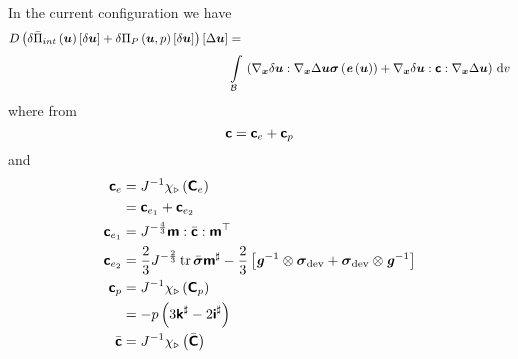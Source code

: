 In the current configuration we have
\begin{equation}
  \begin{split}
    \directionalderiv{}{\variation{\fnof{\bar{\Pi}_{int}}{\vectr{u}}}{\vectr{u}}+\variation{\fnof{\Pi_{P}}{\vectr{u},p}}{\vectr{u}}}{\linearisationdir{\vectr{u}}}&= \\
  &\gint{\embedmanifold{B}}{}{\pbrac{\doubledotprod{\gradient{\vectr{x}}{\variationdir{\vectr{u}}}}{\gradient{\vectr{x}}{\linearisationdir{\vectr{u}}}\fnof{\tensor{\sigma}}{\fnof{\tensor{e}}{\vectr{u}}}}+
            \doubledotprod{\gradient{\vectr{x}}{\variationdir{\vectr{u}}}}{\doubledotprod{\tensorfour{c}}{\gradient{\vectr{x}}{\linearisationdir{\vectr{u}}}}}}}{v}
  \end{split}
\end{equation}
where from 
\begin{equation}
  \boldsymbol{\mathsf{c}}=\boldsymbol{\mathsf{c}}_{e}+\boldsymbol{\mathsf{c}}_{p}
\end{equation}
and
\begin{equation}
  \begin{split}
    \boldsymbol{\mathsf{c}}_{e}&= {J}^{-1}  \chi_{\triangleright}\left( \boldsymbol{\mathsf{C}}_{e} \right) \\
    &=\boldsymbol{\mathsf{c}}_{e_{1}}+\boldsymbol{\mathsf{c}}_{e_{2}}\\
    \boldsymbol{\mathsf{c}}_{e_{1}}&=J^{-\frac{4}{3}} \boldsymbol{\mathsf{m}} : \bar{\boldsymbol{\mathsf{c}}} :  {\boldsymbol{\mathsf{m}}}^{ \top }  \\
    \boldsymbol{\mathsf{c}}_{e_{2}}&=\dfrac{2}{3}J^{-\frac{2}{3}}\operatorname{tr}\bar{\boldsymbol{\mathit{\sigma}}}\boldsymbol{\mathsf{m}}^{\sharp}
    -\dfrac{2}{3}\left[   {\boldsymbol{\mathit{g}}}^{-1}  \otimes \boldsymbol{\mathit{\sigma}}_{\operatorname{dev}} + \boldsymbol{\mathit{\sigma}}_{\operatorname{dev}} \otimes  {\ensuremath{\boldsymbol{\mathit{g}}}}^{-1}   \right]\\
    \boldsymbol{\mathsf{c}}_{p}&= {J}^{-1}  \chi_{\triangleright}\left( \boldsymbol{\mathsf{C}}_{p} \right) \\
    &=-p\left( 3\boldsymbol{\mathsf{k}}^{\sharp}-2\boldsymbol{\mathsf{i}}^{\sharp} \right)\\
  \bar{\boldsymbol{\mathsf{c}}}&= {J}^{-1}  \chi_{\triangleright}\left( \bar{\boldsymbol{\mathsf{C}}} \right) 
  \end{split}
\end{equation}

